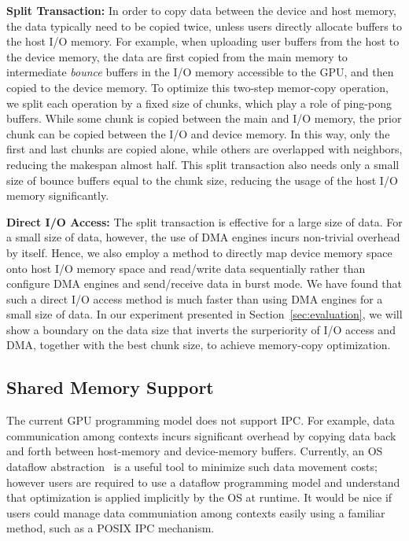 \textbf{Split Transaction:}
In order to copy data between the device and host memory, the data
typically need to be copied twice, unless users directly allocate
buffers to the host I/O memory. 
For example, when uploading user buffers from the host to the device
memory, the data are first copied from the main memory to intermediate
\textit{bounce} buffers in the I/O memory accessible to the GPU, and
then copied to the device memory.
To optimize this two-step memor-copy operation, we split each operation
by a fixed size of chunks, which play a role of ping-pong buffers.
While some chunk is copied between the main and I/O memory, the prior
chunk can be copied between the I/O and device memory.
In this way, only the first and last chunks are copied alone, while
others are overlapped with neighbors, reducing the makespan almost half.
This split transaction also needs only a small size of bounce buffers
equal to the chunk size, reducing the usage of the host I/O memory
significantly.

\textbf{Direct I/O Access:}
The split transaction is effective for a large size of data.
For a small size of data, however, the use of DMA engines incurs
non-trivial overhead by itself.
Hence, we also employ a method to directly map device memory space onto
host I/O memory space and read/write data sequentially rather than
configure DMA engines and send/receive data in burst mode.
We have found that such a direct I/O access method is much faster than
using DMA engines for a small size of data.
In our experiment presented in Section~\ref{sec:evaluation}, we will
show a boundary on the data size that inverts the surperiority of I/O
access and DMA, together with the best chunk size, to achieve
memory-copy optimization.

\subsection{Shared Memory Support}
\label{sec:shared_memory}

The current GPU programming model does not support IPC.
For example, data communication among contexts incurs significant
overhead by copying data back and forth between host-memory and
device-memory buffers.
Currently, an OS dataflow abstraction~\cite{Rossbach_SOSP11} is a useful
tool to minimize such data movement costs; however users are required to
use a dataflow programming model and understand that optimization is
applied implicitly by the OS at runtime.
It would be nice if users could manage data communiation among contexts
easily using a familiar method, such as a POSIX IPC mechanism.

